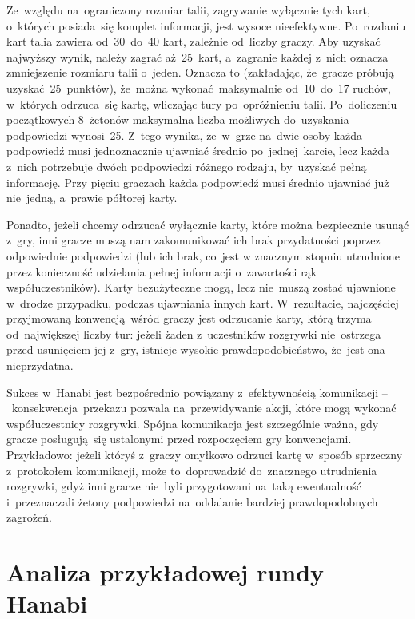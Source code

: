 \documentclass[declaration,shortabstract,inz]{iithesis}
\begin{document}
Ze~względu na~ograniczony rozmiar talii, zagrywanie wyłącznie tych kart, o~których posiada~się komplet informacji, jest wysoce nieefektywne. Po~rozdaniu kart talia zawiera od~30~do~40 kart, zależnie od~liczby graczy. Aby uzyskać najwyższy wynik, należy zagrać aż~25~kart, a~zagranie każdej z~nich oznacza zmniejszenie rozmiaru talii o~jeden. Oznacza to (zakładając, że~gracze próbują uzyskać 25~punktów), że~można wykonać maksymalnie od~10~do~17 ruchów, w~których odrzuca~się kartę, wliczając tury po~opróżnieniu talii. Po~doliczeniu początkowych 8~żetonów maksymalna liczba możliwych do~uzyskania podpowiedzi wynosi~25. Z~tego wynika, że~w~grze na~dwie osoby każda podpowiedź musi jednoznacznie ujawniać średnio po~jednej karcie, lecz każda z~nich potrzebuje dwóch podpowiedzi różnego rodzaju, by~uzyskać pełną informację. Przy pięciu graczach każda podpowiedź musi średnio ujawniać już nie~jedną, a~prawie półtorej karty.

Ponadto, jeżeli chcemy odrzucać wyłącznie karty, które można bezpiecznie usunąć z~gry, inni gracze muszą nam zakomunikować ich brak przydatności poprzez odpowiednie podpowiedzi (lub ich brak, co~jest w znacznym stopniu utrudnione przez konieczność udzielania pełnej informacji o~zawartości rąk współuczestników). Karty bezużyteczne mogą, lecz nie~muszą zostać ujawnione w~drodze przypadku, podczas ujawniania innych kart. W~rezultacie, najczęściej przyjmowaną konwencją wśród graczy jest odrzucanie karty, którą trzyma od~największej liczby tur: jeżeli żaden z~uczestników rozgrywki nie~ostrzega przed usunięciem jej z~gry, istnieje wysokie prawdopodobieństwo, że~jest ona nieprzydatna.

Sukces w~Hanabi jest bezpośrednio powiązany z~efektywnością komunikacji --~konsekwencja przekazu pozwala na~przewidywanie akcji, które mogą wykonać współuczestnicy rozgrywki. Spójna komunikacja jest szczególnie ważna, gdy gracze posługują~się ustalonymi przed rozpoczęciem gry konwencjami. Przykładowo: jeżeli któryś z~graczy omyłkowo odrzuci kartę w~sposób sprzeczny z~protokołem komunikacji, może to~doprowadzić do~znacznego utrudnienia rozgrywki, gdyż inni gracze nie~byli przygotowani na~taką ewentualność i~przeznaczali żetony podpowiedzi na~oddalanie bardziej prawdopodobnych zagrożeń.

\section{Analiza przykładowej rundy Hanabi}
\end{document}
